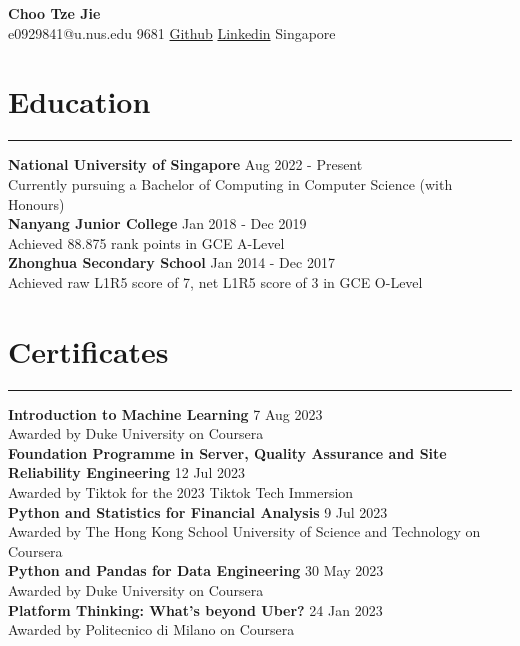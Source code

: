 \documentclass[letterpaper,11pt]{article}
\begin{document}
    {\fontsize{15}{20}\selectfont \textbf{Choo Tze Jie}}
    \\
    \faEnvelope\space e0929841@u.nus.edu 
    \faMobile{} 9681
    \faGithub\space \href{https://github.com/tjch-o}{Github} 
    \faLinkedin\space \href{https://www.linkedin.com/in/tze-jie-choo/}{Linkedin}
    \faMapMarker\space Singapore
     
    \section{Education}
    \vspace{-0.5em} 
    \hrule
    \vspace{0.5em}
    \textbf{National University of Singapore} \hfill Aug 2022 - Present
    \\
    Currently pursuing a Bachelor of Computing in Computer Science (with Honours)
    \\
    \vspace{0.5em}
    \textbf{Nanyang Junior College}  \hfill Jan 2018 - Dec 2019
    \\
    Achieved 88.875 rank points in GCE A-Level 
    \\
    \vspace{0.5em}
    \textbf{Zhonghua Secondary School} \hfill Jan 2014 - Dec 2017
    \\
    Achieved raw L1R5 score of 7, net L1R5 score of 3 in GCE O-Level
     
    \section{Certificates}
    \vspace{-0.5em}
    \hrule
    \vspace{0.5em}
    \textbf{Introduction to Machine Learning} 
    \hfill 7 Aug 2023
    \\
    Awarded by Duke University on Coursera
    \\
    \vspace{0.5em}
    \textbf{Foundation Programme in Server, Quality Assurance and Site Reliability Engineering} 
    \hfill 12 Jul 2023
    \\
    Awarded by Tiktok for the 2023 Tiktok Tech Immersion
    \\
    \vspace{0.5em}
    \textbf{Python and Statistics for Financial Analysis} \hfill 9 Jul 2023
    \\
    Awarded by The Hong Kong School University of Science and Technology on Coursera
    \\
    \vspace{0.5em}
    \textbf{Python and Pandas for Data Engineering} \hfill 30 May 2023
    \\
    Awarded by Duke University on Coursera
    \\
    \vspace{0.5em}
    \textbf{Platform Thinking: What's beyond Uber?} \hfill 24 Jan 2023
    \\
    Awarded by Politecnico di Milano on Coursera
     
\end{document}
